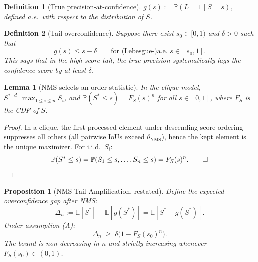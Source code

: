 \documentclass[10pt,twocolumn,letterpaper]{article}
\newtheorem{proposition}{Proposition}
\newtheorem{lemma}{Lemma}
\newtheorem{definition}{Definition}
\begin{document}
\begin{definition}[True precision-at-confidence]
$g(s) := \mathbb{P}(L=1 \mid S=s)$, defined a.e.\ with respect to the
distribution of $S$.
\end{definition}

\begin{definition}[Tail overconfidence]
Suppose there exist $s_0\in[0,1)$ and $\delta>0$ such that
\[
g(s) \le s - \delta \qquad \text{for (Lebesgue-)a.e.\ $s\in[s_0,1]$.} \tag{A}
\]
This says that in the high-score tail, the true precision systematically lags
the confidence score by at least $\delta$.
\end{definition}

\begin{lemma}[NMS selects an order statistic]
\label{lem:order}
In the clique model, $S^* \overset{d}{=} \max_{1\le i\le n} S_i$, and
$\mathbb{P}(S^* \le s) = F_S(s)^n$ for all $s\in[0,1]$, where $F_S$ is the
CDF of $S$.
\end{lemma}
\begin{proof}
In a clique, the first processed element under descending-score ordering
suppresses all others (all pairwise IoUs exceed $\theta_\text{NMS}$), hence
the kept element is the unique maximizer. For i.i.d.\ $S_i$:
\[
\mathbb{P}(S^*\le s)=\mathbb{P}(S_1\le s,\dots,S_n\le s)=F_S(s)^n. \qed
\]
\end{proof}

\begin{proposition}[NMS Tail Amplification, restated]
\label{prop:nms_tail_full}
Define the expected overconfidence gap after NMS:
\[
\Delta_n := \mathbb{E}[S^*] - \mathbb{E}[g(S^*)] = \mathbb{E}[S^* - g(S^*)].
\]
Under assumption (A):
\[
\Delta_n \;\ge\; \delta\bigl(1 - F_S(s_0)^n\bigr).
\]
The bound is non-decreasing in $n$ and strictly increasing whenever
$F_S(s_0)\in(0,1)$.
\end{proposition}
\end{document}
